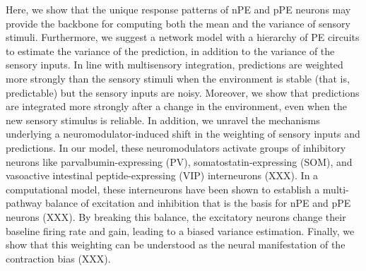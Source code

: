 \documentclass[10pt,a4paper,draft]{article}
\begin{document}
Here, we show that the unique response patterns of nPE and pPE neurons may provide the backbone for computing both the mean and the variance of sensory stimuli. Furthermore, we suggest a network model with a hierarchy of PE circuits to estimate the variance of the prediction, in addition to the variance of the sensory inputs. In line with multisensory integration, predictions are weighted more strongly than the sensory stimuli when the environment is stable (that is, predictable) but the sensory inputs are noisy. Moreover, we show that predictions are integrated more strongly after a change in the environment, even when the new sensory stimulus is reliable. In addition, we unravel the mechanisms underlying a neuromodulator-induced shift in the weighting of sensory inputs and predictions. In our model, these neuromodulators activate groups of inhibitory neurons like parvalbumin-expressing (PV), somatostatin-expressing (SOM), and vasoactive intestinal peptide-expressing (VIP) interneurons (XXX). In a computational model, these interneurons have been shown to establish a multi-pathway balance of excitation and inhibition that is the basis for nPE and pPE neurons (XXX). By breaking this balance, the excitatory neurons change their baseline firing rate and gain, leading to a biased variance estimation. Finally, we show that this weighting can be understood as the neural manifestation of the contraction bias (XXX). 
\end{document}
